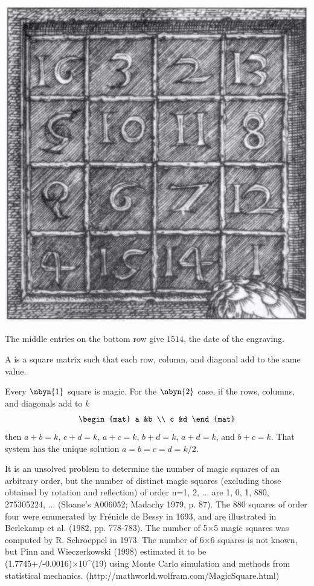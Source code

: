 \begin{center}
  \includegraphics{Melencoliadetail.jpg} %
\end{center}
The middle entries on the bottom row give $1514$, the 
date of the engraving.

A 
is a square matrix such that each row, column, and diagonal add to the same
value.

Every $\nbyn{1}$ square is magic.
For the $\nbyn{2}$ case, if the rows, columns, and diagonals add to $k$
\begin{equation*}
  \begin{mat}
    a  &b  \\
    c  &d
  \end{mat}
\end{equation*}
then $a+b=k$, $c+d=k$, $a+c=k$, $b+d=k$, $a+d=k$, and $b+c=k$.
That system has the unique solution $a=b=c=d=k/2$.




It is an unsolved problem to determine the number of magic squares of an arbitrary order, but the number of distinct magic squares (excluding those obtained by rotation and reflection) of order n=1, 2, ... are 1, 0, 1, 880, 275305224, ... (Sloane's A006052; Madachy 1979, p. 87). The 880 squares of order four were enumerated by Frénicle de Bessy in 1693, and are illustrated in Berlekamp et al. (1982, pp. 778-783). The number of 5×5 magic squares was computed by R. Schroeppel in 1973. The number of 6×6 squares is not known, but Pinn and Wieczerkowski (1998) estimated it to be (1.7745+/-0.0016)×10^(19) using Monte Carlo simulation and methods from statistical mechanics. 
(http://mathworld.wolfram.com/MagicSquare.html)


